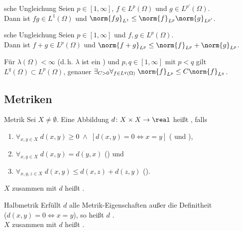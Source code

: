 \begin{Satz}{sche Ungleichung}
    Seien $p \in [1, \infty]$, $f \in L^p(\Omega)$ und $g \in L^{p'}(\Omega)$.\\
    Dann ist $fg \in L^1(\Omega)$ und $\norm{fg}_{L^1} \le \norm{f}_{L^p} \norm{g}_{L^{p'}}$.
\end{Satz}

\begin{Satz}{sche Ungleichung}
    Seien $p \in [1, \infty]$ und $f, g \in L^p(\Omega)$.\\
    Dann ist $f + g \in L^p(\Omega)$ und $\norm{f + g}_{L^p} \le \norm{f}_{L^p} + \norm{g}_{L^p}$.
\end{Satz}

\begin{Bem}
    Für $\lambda(\Omega) < \infty$ (d.\,h. $\lambda$ ist ein )
    und $p, q \in [1, \infty]$ mit $p < q$ gilt
    $L^q(\Omega) \subset L^p(\Omega)$, genauer
    $\exists_{C > 0} \forall_{f \in L^q(\Omega)}\; \norm{f}_{L^p} \le C \norm{f}_{L^q}$.
\end{Bem}

\subsection{%
    Metriken%
}

\begin{Def}{Metrik}
    Sei $X \not= \emptyset$.
    Eine Abbildung $d\colon X \times X \rightarrow \real$ heißt , falls
    \begin{enumerate}
        \item
        $\forall_{x, y \in X}\; d(x, y) \ge 0 \;\land\; [d(x, y) = 0 \iff x = y]$
        ( und ),

        \item
        $\forall_{x, y \in X}\; d(x, y) = d(y, x)$
        () und

        \item
        $\forall_{x, y, z \in X}\; d(x, y) \le d(x, z) + d(z, y)$
        ().
    \end{enumerate}
    $X$ zusammen mit $d$ heißt .
\end{Def}

\begin{Def}{Halbmetrik}
    Erfüllt $d$ alle Metrik-Eigenschaften außer die Definitheit\\
    ($d(x, y) = 0 \iff x = y$),
    so heißt $d$ .\\
    $X$ zusammen mit $d$ heißt .
\end{Def}

